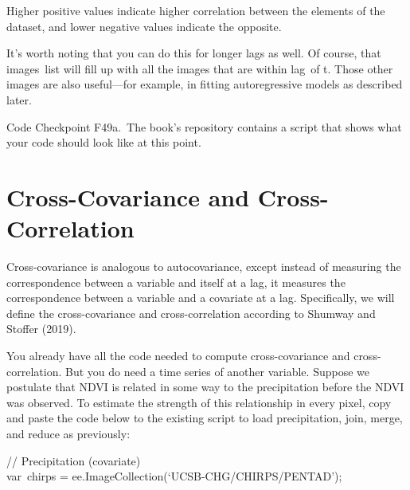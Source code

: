 \documentclass[
  letterpaper,
  DIV=11,
  numbers=noendperiod]{scrreprt}
\begin{document}
Higher positive values indicate higher correlation between the elements
of the dataset, and lower negative values indicate the opposite.

It's worth noting that you can do this for longer lags as well. Of
course, that images~list will fill up with all the images that are
within lag~of t. Those other images are also useful---for example, in
fitting autoregressive models as described later.

\begin{tcolorbox}[enhanced jigsaw, left=2mm, breakable, rightrule=.15mm, opacityback=0, colframe=quarto-callout-note-color-frame, colbacktitle=quarto-callout-note-color!10!white, arc=.35mm, opacitybacktitle=0.6, toptitle=1mm, colback=white, leftrule=.75mm, title=\textcolor{quarto-callout-note-color}{\faInfo}\hspace{0.5em}{Note}, toprule=.15mm, bottomtitle=1mm, titlerule=0mm, bottomrule=.15mm, coltitle=black]

Code Checkpoint F49a.~The book's repository contains a script that shows
what your code should look like at this point.

\end{tcolorbox}

\hypertarget{cross-covariance-and-cross-correlation}{%
\section{Cross-Covariance and
Cross-Correlation}\label{cross-covariance-and-cross-correlation}}

Cross-covariance is analogous to autocovariance, except instead of
measuring the correspondence between a variable and itself at a lag, it
measures the correspondence between a variable and a covariate at a lag.
Specifically, we will define the cross-covariance and cross-correlation
according to Shumway and Stoffer (2019).~

You already have all the code needed to compute cross-covariance and
cross-correlation. But you do need a time series of another variable.
Suppose we postulate that NDVI is related in some way to the
precipitation before the NDVI was observed. To estimate the strength of
this relationship in every pixel, copy and paste the code below to the
existing script to load precipitation, join, merge, and reduce as
previously:

// Precipitation (covariate)\\
var~chirps = ee.ImageCollection(`UCSB-CHG/CHIRPS/PENTAD');
\end{document}

